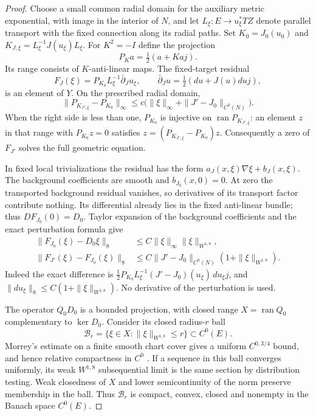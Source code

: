 \documentclass[11pt]{article}
\numberwithin{equation}{section}
\theoremstyle{definition}
\theoremstyle{remark}
\begin{document}
\begin{proof}
Choose a small common radial domain for the auxiliary metric
exponential, with image in the interior of $N$, and let
$L_\xi:E\to u_\xi^*TZ$ denote parallel transport with the fixed
connection along its radial paths. Set
$K_0=J_0(u_0)$ and $K_{J,\xi}=L_\xi^{-1}J(u_\xi)L_\xi$.
For $K^2=-I$ define the projection
\[
 P_K a=\tfrac12(a+Kaj).
\]
Its range consists of $K$-anti-linear maps. The fixed-target
residual
\[
 F_J(\xi)=P_{K_0}L_\xi^{-1}\bar\partial_Ju_\xi,\qquad
 \bar\partial_Ju=\tfrac12(du+J(u)duj),
\]
is an element of $Y$. On the prescribed radial domain,
\[
 \|P_{K_{J',\xi}}-P_{K_0}\|_\infty
 \le c\bigl(\|\xi\|_\infty+\|J'-J_0\|_{C^0(N)}\bigr).
\]
When the right side is less than one, $P_{K_0}$ is injective
on $\operatorname{ran}P_{K_{J',\xi}}$: an element $z$ in that
range with $P_{K_0}z=0$ satisfies
$z=(P_{K_{J',\xi}}-P_{K_0})z$. Consequently a zero of
$F_{J'}$ solves the full geometric equation.

In fixed local trivializations the residual has the form
$a_J(x,\xi)\nabla\xi+b_J(x,\xi)$. The background coefficients
are smooth and $b_{J_0}(x,0)=0$. At zero the transported
background residual vanishes, so derivatives of its transport
factor contribute nothing. Its differential already lies in
the fixed anti-linear bundle; thus $DF_{J_0}(0)=D_0$.
Taylor expansion of the background coefficients and the exact
perturbation formula give
\begin{align}
 \|F_{J_0}(\xi)-D_0\xi\|_8
 &\le C\|\xi\|_\infty\|\xi\|_{W^{1,8}},\label{eq:c0-sphere-remainder}\\
 \|F_{J'}(\xi)-F_{J_0}(\xi)\|_8
 &\le C\|J'-J_0\|_{C^0(N)}
              (1+\|\xi\|_{W^{1,8}}).\label{eq:c0-sphere-perturbation}
\end{align}
Indeed the exact difference is
$\tfrac12P_{K_0}L_\xi^{-1}(J'-J_0)(u_\xi)\,du_\xi j$,
and $\|du_\xi\|_8\le C(1+\|\xi\|_{W^{1,8}})$.
No derivative of the perturbation is used.

The operator $Q_0D_0$ is a bounded projection, with closed
range $X=\operatorname{ran}Q_0$ complementary to $\ker D_0$.
Consider its closed radius-$r$ ball
\[
 \mathcal B_r=\{\xi\in X:\|\xi\|_{W^{1,8}}\le r\}
                  \subset C^0(E).
\]
Morrey's estimate on a finite smooth chart cover gives a
uniform $C^{0,3/4}$ bound, and hence relative compactness in
$C^0$ \cite[Theorem~3.22, p.~71]{Laugesen2020LinearAnalysis}.
If a sequence in this ball converges uniformly, its weak
$W^{1,8}$ subsequential limit is the same section by distribution
testing. Weak closedness of $X$ and lower semicontinuity of the
norm preserve membership in the ball. Thus $\mathcal B_r$ is
compact, convex, closed and nonempty in the Banach space $C^0(E)$.


\end{proof}
\end{document}
